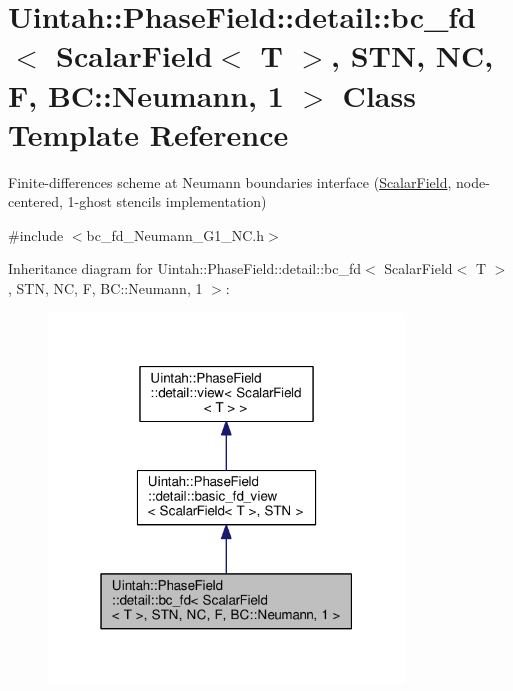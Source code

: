 \hypertarget{classUintah_1_1PhaseField_1_1detail_1_1bc__fd_3_01ScalarField_3_01T_01_4_00_01STN_00_01NC_00_01F_00_01BC_1_1Neumann_00_011_01_4}{}\section{Uintah\+:\+:Phase\+Field\+:\+:detail\+:\+:bc\+\_\+fd$<$ Scalar\+Field$<$ T $>$, S\+TN, NC, F, BC\+:\+:Neumann, 1 $>$ Class Template Reference}
\label{classUintah_1_1PhaseField_1_1detail_1_1bc__fd_3_01ScalarField_3_01T_01_4_00_01STN_00_01NC_00_01F_00_01BC_1_1Neumann_00_011_01_4}


Finite-\/differences scheme at Neumann boundaries interface (\hyperlink{structUintah_1_1PhaseField_1_1ScalarField}{Scalar\+Field}, node-\/centered, 1-\/ghost stencils implementation)  




{\ttfamily \#include $<$bc\+\_\+fd\+\_\+\+Neumann\+\_\+\+G1\+\_\+\+N\+C.\+h$>$}



Inheritance diagram for Uintah\+:\+:Phase\+Field\+:\+:detail\+:\+:bc\+\_\+fd$<$ Scalar\+Field$<$ T $>$, S\+TN, NC, F, BC\+:\+:Neumann, 1 $>$\+:\nopagebreak
\begin{figure}[H]
\begin{center}
\leavevmode
\includegraphics[width=268pt]{classUintah_1_1PhaseField_1_1detail_1_1bc__fd_3_01ScalarField_3_01T_01_4_00_01STN_00_01NC_00_01F7d085f441019d0b213df9eba1b242bd7}
\end{center}
\end{figure}


